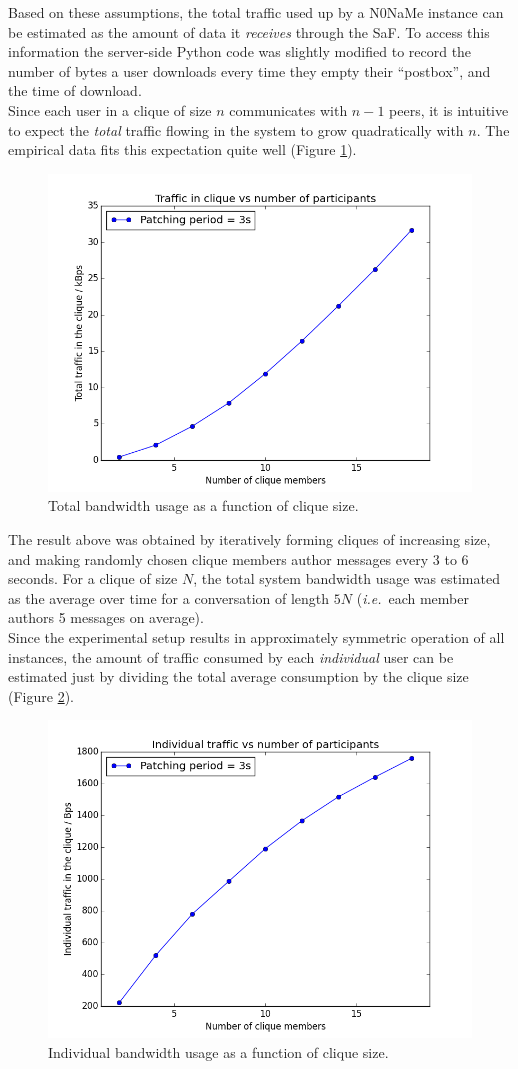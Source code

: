 \documentclass[a4paper, twoside, 12pt]{report}
\newcommand{\funkytt}{\fontfamily{AnonymousPro}\selectfont}
\begin{document}
Based on these assumptions, the total traffic used up by a {\funkytt N0NaMe} instance can be estimated as the amount of data it \emph{receives} through the SaF. To access this information the server-side Python code was slightly modified to record the number of bytes a user downloads every time they empty their ``postbox'', and the time of download. \\

Since each user in a clique of size $n$ communicates with $n-1$ peers, it is intuitive to expect the \emph{total} traffic flowing in the system to grow quadratically with $n$. The empirical data fits this expectation quite well (Figure \ref{fig:alltraf}).

\begin{figure}[H]
    \captionsetup{width=0.9\textwidth}
    \centering
    \includegraphics[width=0.60\linewidth]{pics/eval/alltraf_vs_N.png}
    \caption{\label{fig:alltraf} Total bandwidth usage as a function of clique size.}
\end{figure}
The result above was obtained by iteratively forming cliques of increasing size, and making randomly chosen clique members author messages every 3 to 6 seconds. For a clique of size $N$, the total system bandwidth usage was estimated as the average over time for a conversation of length $5N$ (\textit{i.e.}~each member authors 5 messages on average). \\

Since the experimental setup results in approximately symmetric operation of all instances, the amount of traffic consumed by each \emph{individual} user can be estimated just by dividing the total average consumption by the clique size (Figure \ref{fig:traf_vs_N}).

\begin{figure}[H]
    \captionsetup{width=0.9\textwidth}
    \centering
    \includegraphics[width=0.65\linewidth]{pics/eval/traf_vs_N.png}
    \caption{\label{fig:traf_vs_N} Individual bandwidth usage as a function of clique size.}
\end{figure}
\end{document}
